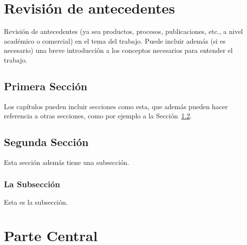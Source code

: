 \documentclass{prgrado}
\begin{document}


\chapter{Revisión de antecedentes} 

Revisión de antecedentes (ya sea productos, procesos, publicaciones, etc., a nivel académico o comercial) en el tema del trabajo. Puede incluir además (si es necesario) una breve introducción a los conceptos necesarios para entender el trabajo.

\section{Primera Sección}

Los capítulos pueden incluir secciones como esta, que además pueden hacer referencia a otras secciones, como por ejemplo a la Sección~\ref{sec:segunda}.


\section{Segunda Sección}\label{sec:segunda}

Esta sección además tiene una subsección.

\subsection{La Subsección}

Esta es la subsección.



\chapter{Parte Central}
\end{document}
